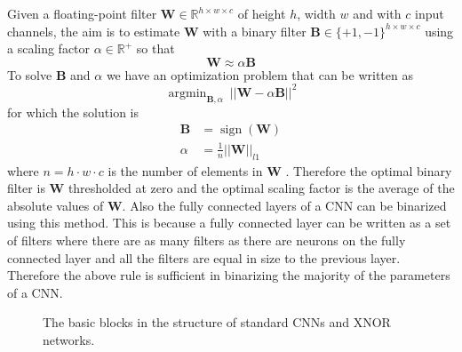 \documentclass[conference]{IEEEtran}
\DeclareMathOperator*{\argmin}{argmin}
\DeclareMathOperator{\sign}{sign}
\begin{document}
Given a floating-point filter $\mathbf{W}\in\mathbb{R}^{h\times w\times c}$ of height $h$, width $w$ and with $c$ input channels, the aim is to estimate $\mathbf{W}$ with a binary filter $\mathbf{B}\in\{+1,-1\}^{h\times w\times c}$ using a scaling factor $\alpha \in \mathbb{R}^{+}$ so that 
\begin{equation}
\mathbf{W}\approx\alpha\mathbf{B}
\label{eq:approx}
\end{equation}
To solve $\mathbf{B}$ and $\alpha$ we have an optimization problem that can be written as
\begin{equation}
\argmin_{\mathbf{B}, \alpha}\ \lvert\lvert\mathbf{W} - \alpha\mathbf{B}\rvert\rvert^2
\end{equation}
for which the solution is
\begin{align}
\mathbf{B} &= \sign(\mathbf{W}) \\
\alpha &= \frac{1}{n}\lvert\lvert\mathbf{W}\rvert\rvert_{l1}
\label{eq:alpha}
\end{align}
where $n=h\cdot w\cdot c$ is the number of elements in $\mathbf{W}$ \cite{xnor}. Therefore the optimal binary filter is $\mathbf{W}$ thresholded at zero and the optimal scaling factor is the average of the absolute values of $\mathbf{W}$. Also the fully connected layers of a CNN can be binarized using this method. This is because a fully connected layer can be written as a set of filters where there are as many filters as there are neurons on the fully connected layer and all the filters are equal in size to the previous layer. Therefore the above rule is sufficient in binarizing the majority of the parameters of a CNN.

\begin{figure}[!t]
\centering
{}
\hfill
{}
\caption{The basic blocks in the structure of standard CNNs and XNOR networks.}
\end{figure}
\end{document}

